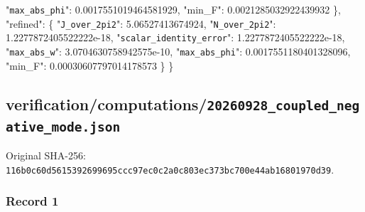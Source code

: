 \documentclass[
  10pt,
]{article}
\newenvironment{Shaded}{}{}
\newcommand{\DataTypeTok}[1]{\textcolor[rgb]{0.56,0.13,0.00}{#1}}
\newcommand{\FloatTok}[1]{\textcolor[rgb]{0.25,0.63,0.44}{#1}}
\newcommand{\FunctionTok}[1]{\textcolor[rgb]{0.02,0.16,0.49}{#1}}
\begin{document}
\begin{Shaded}
\begin{Highlighting}[]
    \DataTypeTok{"\nolinkurl{max_abs_phi}"}\FunctionTok{:} \FloatTok{0.0017551019464581929}\FunctionTok{,}
    \DataTypeTok{"min\_F"}\FunctionTok{:} \FloatTok{0.0021285032922439932}
  \FunctionTok{\},}
  \DataTypeTok{"refined"}\FunctionTok{:} \FunctionTok{\{}
    \DataTypeTok{"\nolinkurl{J_over_2pi2}"}\FunctionTok{:} \FloatTok{5.06527413674924}\FunctionTok{,}
    \DataTypeTok{"\nolinkurl{N_over_2pi2}"}\FunctionTok{:} \FloatTok{1.2277872405522222e{-}18}\FunctionTok{,}
    \DataTypeTok{"\nolinkurl{scalar_identity_error}"}\FunctionTok{:} \FloatTok{1.2277872405522222e{-}18}\FunctionTok{,}
    \DataTypeTok{"\nolinkurl{max_abs_w}"}\FunctionTok{:} \FloatTok{3.0704630758942575e{-}10}\FunctionTok{,}
    \DataTypeTok{"\nolinkurl{max_abs_phi}"}\FunctionTok{:} \FloatTok{0.0017551180401328096}\FunctionTok{,}
    \DataTypeTok{"min\_F"}\FunctionTok{:} \FloatTok{0.00030607797014178573}
  \FunctionTok{\}}
\FunctionTok{\}}
\end{Highlighting}
\end{Shaded}

\hypertarget{verificationcomputations20260928_coupled_negative_mode.json}{%
\subsection{verification/computations/\nolinkurl{20260928_coupled_negative_mode.json}}\label{verificationcomputations20260928_coupled_negative_mode.json}}

Original SHA-256:
\nolinkurl{116b0c60d5615392699695ccc97ec0c2a0c803ec373bc700e44ab16801970d39}.

\hypertarget{record-1-4}{%
\subsubsection{Record 1}\label{record-1-4}}
\end{document}
